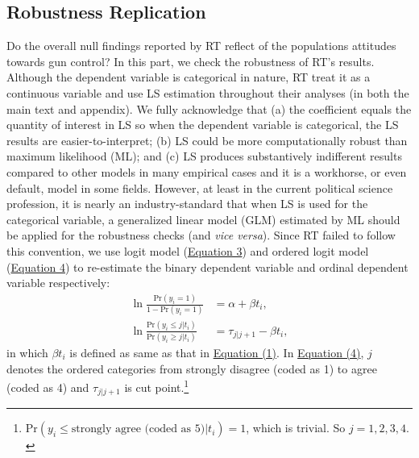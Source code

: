 \documentclass[11pt]{article}
\begin{document}
\subsection*{Robustness Replication}
Do the overall null findings reported by RT reflect of the populations attitudes towards gun control? In this part, we check the robustness of RT's results. Although the dependent variable is categorical in nature, RT treat it as a continuous variable and use LS estimation throughout their analyses (in both the main text and appendix). We fully acknowledge that (a) the coefficient equals the quantity of interest in LS so when the dependent variable is categorical, the LS results are easier-to-interpret; (b) LS could be more computationally robust than maximum likelihood (ML); and (c) LS produces substantively indifferent results compared to other models in many empirical cases and it is a workhorse, or even default, model in some fields. However, at least in the current political science profession, it is nearly an industry-standard that when LS is used for the categorical variable, a generalized linear model (GLM) estimated by ML should be applied for the robustness checks (and \emph{vice versa}). Since RT failed to follow this convention, we use logit model (\hyperref[eq3]{Equation 3}) and ordered logit model (\hyperref[eq4]{Equation 4}) to re-estimate the binary dependent variable and ordinal dependent variable respectively:
\begin{align}
\ln\frac{\text{Pr}(y_i = 1)}{1 - \text{Pr}(y_i = 1)} & = \alpha + \beta t_{i},\label{eq3}\\
\ln\frac{\text{Pr}(y_i \leq j|t_i)}{\text{Pr}(y_i \geq j|t_i)} & = \tau_{j|j+1} - \beta t_i,\label{eq4}
\end{align}
in which \(\beta t_i\) is defined as same as that in \hyperref[eq1]{Equation (1)}. In \hyperref[eq4]{Equation (4)}, \(j\) denotes the ordered categories from strongly disagree (coded as 1) to agree (coded as 4) and \(\tau_{j|j+1}\) is cut point.\footnote{\(\text{Pr}(y_i \leq \text{strongly agree (coded as 5)}|t_i) = 1\), which is trivial. So \(j = 1, 2, 3, 4.\)}
\end{document}
